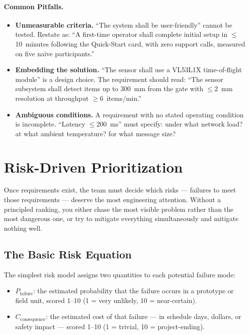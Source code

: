\paragraph{Common Pitfalls.}
\begin{itemize}
  \item \textbf{Unmeasurable criteria.} ``The system shall be user-friendly'' cannot be tested.
        Restate as: ``A first-time operator shall complete initial setup in $\leq$10~minutes following the Quick-Start card, with zero support calls, measured on five na\"{i}ve participants.''
  \item \textbf{Embedding the solution.} ``The sensor shall use a VL53L1X time-of-flight module'' is a design choice.
        The requirement should read: ``The sensor subsystem shall detect items up to 300~mm from the gate with $\leq$2~mm resolution at throughput $\geq$6~items/min.''
  \item \textbf{Ambiguous conditions.} A requirement with no stated operating condition is incomplete.
        ``Latency $\leq$200~ms'' must specify: under what network load? at what ambient temperature? for what message size?
\end{itemize}

\section{Risk-Driven Prioritization}
\label{sec:ch4-risk-priority}

Once requirements exist, the team must decide which risks — failures to meet those requirements — deserve the most engineering attention.
Without a principled ranking, you either chase the most visible problem rather than the most dangerous one, or try to mitigate everything simultaneously and mitigate nothing well.

\subsection{The Basic Risk Equation}
\label{subsec:ch4-risk-eq}

The simplest risk model assigns two quantities to each potential failure mode:

\begin{itemize}
  \item $P_{\text{failure}}$: the estimated probability that the failure occurs in a prototype or field unit, scored 1–10 (1 = very unlikely, 10 = near-certain).
  \item $C_{\text{consequence}}$: the estimated cost of that failure — in schedule days, dollars, or safety impact — scored 1–10 (1 = trivial, 10 = project-ending).
\end{itemize}

